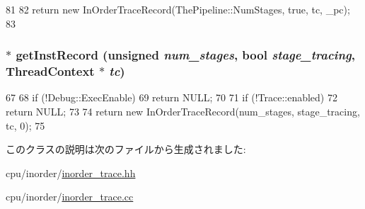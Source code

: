 \begin{DoxyCode}
81 {
82     return new InOrderTraceRecord(ThePipeline::NumStages, true, tc, _pc);
83 }
\end{DoxyCode}
\hypertarget{classTrace_1_1InOrderTrace_a2782dbbbe99c4155b3fd1702975fd443}{
\subsubsection[{getInstRecord}]{ $\ast$ getInstRecord (unsigned {\em num\_\-stages}, \/  bool {\em stage\_\-tracing}, \/  {\bf ThreadContext} $\ast$ {\em tc})}}
\label{classTrace_1_1InOrderTrace_a2782dbbbe99c4155b3fd1702975fd443}



\begin{DoxyCode}
67 {
68     if (!Debug::ExecEnable)
69         return NULL;
70 
71     if (!Trace::enabled)
72         return NULL;
73 
74     return new InOrderTraceRecord(num_stages, stage_tracing, tc, 0);
75 }
\end{DoxyCode}


このクラスの説明は次のファイルから生成されました:\begin{DoxyCompactItemize}
\item 
cpu/inorder/\hyperlink{inorder__trace_8hh}{inorder\_\-trace.hh}\item 
cpu/inorder/\hyperlink{inorder__trace_8cc}{inorder\_\-trace.cc}\end{DoxyCompactItemize}
